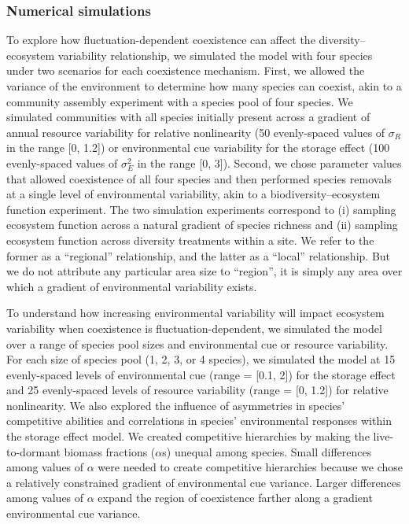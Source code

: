\documentclass[12pt,]{article}
\begin{document}
\subsubsection{Numerical simulations}\label{numerical-simulations}

To explore how fluctuation-dependent coexistence can affect the
diversity--ecosystem variability relationship, we simulated the model
with four species under two scenarios for each coexistence mechanism.
First, we allowed the variance of the environment to determine how many
species can coexist, akin to a community assembly experiment with a
species pool of four species. We simulated communities with all species
initially present across a gradient of annual resource variability for
relative nonlinearity (50 evenly-spaced values of \(\sigma_R\) in the
range {[}0, 1.2{]}) or environmental cue variability for the storage
effect (100 evenly-spaced values of \(\sigma_E^2\) in the range {[}0,
3{]}). Second, we chose parameter values that allowed coexistence of all
four species and then performed species removals at a single level of
environmental variability, akin to a biodiversity--ecosystem function
experiment. The two simulation experiments correspond to (i) sampling
ecosystem function across a natural gradient of species richness and
(ii) sampling ecosystem function across diversity treatments within a
site. We refer to the former as a ``regional'' relationship, and the
latter as a ``local'' relationship. But we do not attribute any
particular area size to ``region'', it is simply any area over which a
gradient of environmental variability exists.

To understand how increasing environmental variability will impact
ecosystem variability when coexistence is fluctuation-dependent, we
simulated the model over a range of species pool sizes and environmental
cue or resource variability. For each size of species pool (1, 2, 3, or
4 species), we simulated the model at 15 evenly-spaced levels of
environmental cue (range = {[}0.1, 2{]}) for the storage effect and 25
evenly-spaced levels of resource variability (range = {[}0, 1.2{]}) for
relative nonlinearity. We also explored the influence of asymmetries in
species' competitive abilities and correlations in species'
environmental responses within the storage effect model. We created
competitive hierarchies by making the live-to-dormant biomass fractions
(\(\alpha\)s) unequal among species. Small differences among values of
\(\alpha\) were needed to create competitive hierarchies because we
chose a relatively constrained gradient of environmental cue variance.
Larger differences among values of \(\alpha\) expand the region of
coexistence farther along a gradient environmental cue variance.
\end{document}
